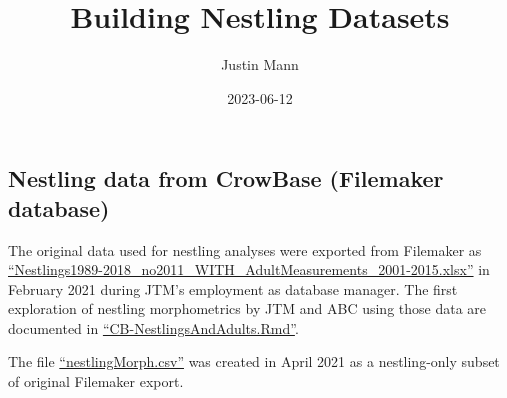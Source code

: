 \documentclass[
]{article}
\title{Building Nestling Datasets}
\author{Justin Mann}
\date{2023-06-12}
\begin{document}
\maketitle

\hypertarget{nestling-data-from-crowbase-filemaker-database}{%
\subsection{Nestling data from CrowBase (Filemaker
database)}\label{nestling-data-from-crowbase-filemaker-database}}

The original data used for nestling analyses were exported from
Filemaker as
\href{https://github.com/justinthomasmann/CrowBase/blob/main/OldDocs/Nestlings1989-2018_no2011_WITH_AdultMeasurements_2001-2015.xlsx}{``Nestlings1989-2018\_no2011\_WITH\_AdultMeasurements\_2001-2015.xlsx''}
in February 2021 during JTM's employment as database manager. The first
exploration of nestling morphometrics by JTM and ABC using those data
are documented in
\href{https://github.com/justinthomasmann/CrowBase/blob/main/CB-NestlingsAndAdults.Rmd}{``CB-NestlingsAndAdults.Rmd''}.

The file
\href{https://github.com/justinthomasmann/CrowBase/blob/main/nestlingMorph.csv}{``nestlingMorph.csv''}
was created in April 2021 as a nestling-only subset of original
Filemaker export.
\end{document}
